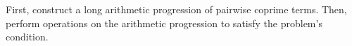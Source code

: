 First, construct a long arithmetic progression of pairwise coprime terms. Then, perform operations on the arithmetic progression to satisfy the problem’s condition.